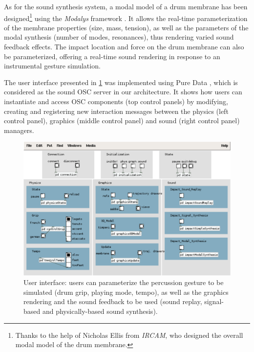 As for the sound synthesis system, a modal model of a drum membrane has been designed\footnote{Thanks to the help of Nicholas Ellis from \emph{IRCAM}, who designed the overall modal model of the drum membrane.} using the \emph{Modalys} framework . It allows the real-time parameterization of the membrane properties (size, mass, tension), as well as the parameters of the modal synthesis (number of modes, resonances), thus rendering varied sound feedback effects. The impact location and force on the drum membrane can also be parameterized, offering a real-time sound rendering in response to an instrumental gesture simulation.

The user interface presented in \myfigname \ref{fig:userInterface} was implemented using Pure Data , which is considered as the sound OSC server in our architecture. It shows how users can instantiate and access OSC components (top control panels) by modifying, creating and registering new interaction messages between the physics (left control panel), graphics (middle control panel) and sound (right control panel) managers.

\begin{figure}[H]
	\centering
	\includegraphics[width=0.8\linewidth]{Chapters/5/Pics/Pdf/userInterface.pdf}
	\caption[User interface]{User interface: users can parameterize the percussion gesture to be simulated (drum grip, playing mode, tempo), as well as the graphics rendering and the sound feedback to be used (sound replay, signal-based and physically-based sound synthesis).}
	\label{fig:userInterface}
\end{figure}

